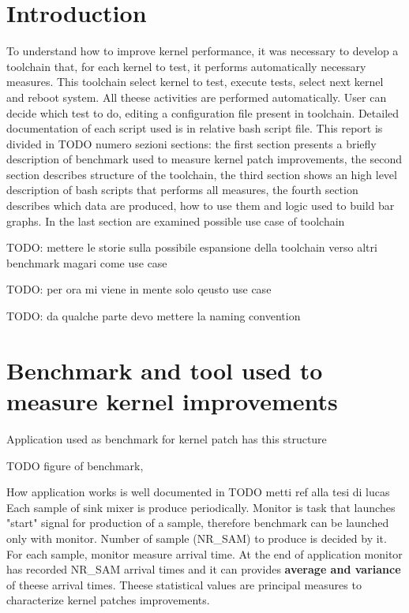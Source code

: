 \documentclass[a4paper,10pt]{article}
\begin{document}
\vspace{4ex}	%
\begin{multicols}{2}

\section{Introduction}

To understand how to improve kernel performance, it was necessary to develop a toolchain
that, for each kernel to test, it performs automatically necessary measures.
This toolchain select kernel to test, execute tests, select next kernel and reboot system.
All theese activities are performed automatically. User can decide which test to do, 
editing a configuration file present in toolchain. Detailed documentation of each script
used is in relative bash script file.
This report is divided in TODO numero sezioni sections: the first section presents a
briefly description of benchmark used to measure kernel patch improvements, 
the second section describes structure of the toolchain,
the third section shows an high level description of bash scripts that performs
all measures, the fourth section describes which data are produced, how to use them
and logic used to build bar graphs. In the last section are examined possible use case
of toolchain

TODO: mettere le storie sulla possibile espansione della toolchain verso altri benchmark
magari come use case

TODO: per ora mi viene in mente solo qeusto use case

TODO: da qualche parte devo mettere la naming convention

\section{Benchmark and tool used to measure kernel improvements}

Application used as benchmark for kernel patch has this structure

TODO figure of benchmark, 

How application works is well documented in TODO metti ref alla tesi di lucas
Each sample of sink mixer is produce periodically. Monitor is task that launches "start"
signal for production of a sample, therefore benchmark can be launched only with
monitor. Number of sample (NR\_SAM) to produce is decided by it. 
For each sample, monitor measure arrival time. At the end of application 
monitor has recorded NR\_SAM arrival times and it can provides 
\textbf{ average and variance} of theese arrival times. 
Theese statistical values are principal measures to characterize 
kernel patches improvements.


\end{multicols}
\end{document}

